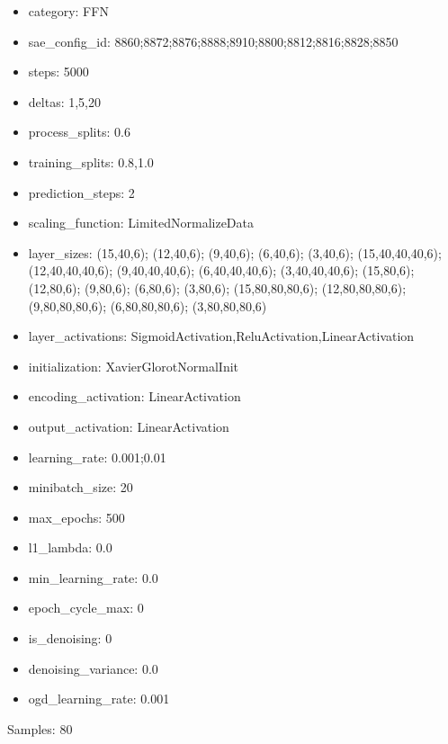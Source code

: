 \documentclass[a4paper,11pt,oneside]{article}
\theoremstyle{plain}
\theoremstyle{definition}
\begin{document}
\begin{itemize}
	\item category: FFN
	\item sae\_config\_id: 8860;8872;8876;8888;8910;8800;8812;8816;8828;8850
	\item steps: 5000
	\item deltas: 1,5,20
	\item process\_splits: 0.6
	\item training\_splits: 0.8,1.0
	\item prediction\_steps: 2
	\item scaling\_function: LimitedNormalizeData
	\item layer\_sizes: (15,40,6); (12,40,6); (9,40,6); (6,40,6); (3,40,6); (15,40,40,40,6); (12,40,40,40,6); (9,40,40,40,6); (6,40,40,40,6); (3,40,40,40,6); (15,80,6);(12,80,6); (9,80,6); (6,80,6); (3,80,6); (15,80,80,80,6); (12,80,80,80,6); (9,80,80,80,6); (6,80,80,80,6); (3,80,80,80,6)
	\item layer\_activations: SigmoidActivation,ReluActivation,LinearActivation
	\item initialization: XavierGlorotNormalInit
	\item encoding\_activation: LinearActivation
	\item output\_activation: LinearActivation
	\item learning\_rate: 0.001;0.01
	\item minibatch\_size: 20
	\item max\_epochs: 500
	\item l1\_lambda: 0.0
	\item min\_learning\_rate: 0.0
	\item epoch\_cycle\_max: 0
	\item is\_denoising: 0
	\item denoising\_variance: 0.0
	\item ogd\_learning\_rate: 0.001
\end{itemize}

Samples: 80
\end{document}
